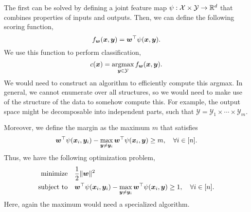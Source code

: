 The first can be solved by defining a joint feature map $\psi: \mathcal{X} \times \mathcal{Y} \to
    \mathbb{R}^d$ that combines properties of inputs and outputs. Then, we can define
the following scoring function, \[
    f_{\bm{w}}(\bm{x}, \bm{y}) = \bm{w}^\top \psi(\bm{x}, \bm{y}).
\]
We use this function to perform classification, \[
    c(\bm{x}) = \operatorname*{argmax}_{\bm{y} \in \mathcal{Y}} f_{\bm{w}}(\bm{x}, \bm{y}).
\]
We would need to construct an algorithm to efficiently compute this argmax. In general, we cannot
enumerate over all structures, so we would need to make use of the structure of the data to somehow
compute this. For example, the output space might be decomposable into independent parts, such that
$\mathcal{Y} = \mathcal{Y}_1 \times \cdots \times \mathcal{Y}_m$.

Moreover, we define the margin as the maximum $m$ that satisfies \[
    \bm{w}^\top \psi(\bm{x}_i, \bm{y}_i) - \max_{\bm{y} \neq \bm{y}_i} \bm{w}^\top \psi(\bm{x}_i, \bm{y}) \geq m, \quad \forall i \in [n].
\]
Thus, we have the following optimization problem,
\begin{align*}
    \text{minimize}   & \quad \frac{1}{2} \| \bm{w} \|^2                                                                                                                                  \\
    \text{subject to} & \quad \bm{w}^\top \psi(\bm{x}_i, \bm{y}_i) - \max_{\bm{y} \neq \bm{y}_i} \bm{w}^\top \psi(\bm{x}_i, \bm{y}) \geq 1, \quad \forall i \in [n].
\end{align*}
Here, again the maximum would need a specialized algorithm.

